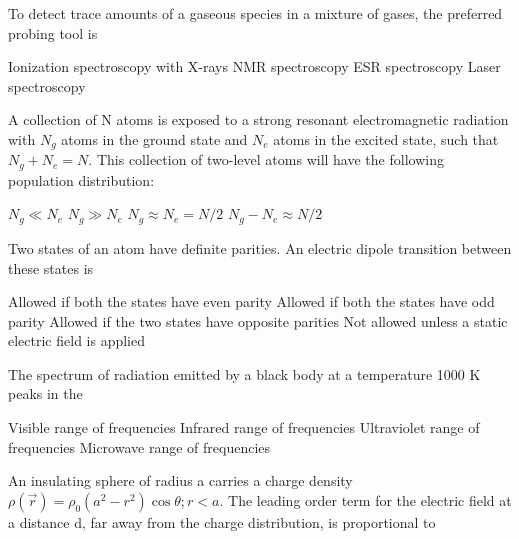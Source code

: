 \documentclass{exam}
\begin{document}
\begin{questions}
\question To detect trace amounts of a gaseous species in a mixture of gases, the preferred probing tool is\hfill{}

\begin{choices}
	\begin{multicols}{2}
\choice Ionization spectroscopy with X-rays \choice NMR spectroscopy
	\choice ESR spectroscopy \choice Laser spectroscopy
	\end{multicols}
\end{choices}

\question A collection of N atoms is exposed to a strong resonant electromagnetic radiation with $N_g$ atoms in the ground state and $N_e$ atoms in the excited state, such that $N_g+N_e=N$. This collection of two-level atoms will have the following population distribution:\hfill{}

\begin{oneparchoices}
	\choice $N_g \ll N_e$ \choice $N_g \gg N_e$ \choice $N_g \approx N_e = N/2$ \choice $N_g - N_e \approx N/2$
\end{oneparchoices}

\question Two states of an atom have definite parities. An electric dipole transition between these states is\hfill{}

\begin{choices}
	\choice Allowed if both the states have even parity
	\choice Allowed if both the states have odd parity
	\choice Allowed if the two states have opposite parities
	\choice Not allowed unless a static electric field is applied
\end{choices}

\question The spectrum of radiation emitted by a black body at a temperature 1000 K peaks in the\hfill{}

\begin{choices}
	\begin{multicols}{2}
	 \choice Visible range of frequencies \choice Infrared range of frequencies
	\choice Ultraviolet range of frequencies \choice Microwave range of frequencies
	\end{multicols}
\end{choices}

\question An insulating sphere of radius a carries a charge density $\rho(\vec{r})=\rho_{0}(a^{2}-r^{2})\cos\theta; r<a$. The leading order term for the electric field at a distance d, far away from the charge distribution, is proportional to\hfill{}


\end{questions}
\end{document}
